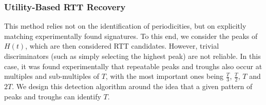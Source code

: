 
%
%


\subsubsection{Utility-Based RTT Recovery}
\label{sect:utilityBasedRecovery}
This method relies not on the identification of periodicities, but on explicitly matching experimentally found signatures. To this end, we consider the peaks of $H(t)$, which are then considered RTT candidates.  However, trivial discriminators (such as simply selecting the highest peak) are not reliable. In this case, it was found experimentally that repeatable peaks and troughs also occur at multiples and sub-multiples of $T$, with the most important ones being $\frac{T}{3}$, $\frac{T}{2}$, $T$ and $2T$. We design this detection algorithm around the idea that a given pattern of peaks and troughs can identify $T$.

